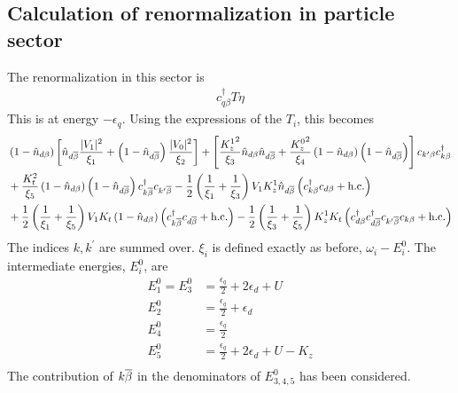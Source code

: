 \documentclass[12pt,twoside]{article}
\numberwithin{equation}{section}
\begin{document}
\subsection{Calculation of renormalization in particle sector}
The renormalization in this sector is
\begin{equation}\begin{aligned}
	c^\dagger_{q\beta} T \eta
\end{aligned}\end{equation}
This is at energy \(-\epsilon_q\).
Using the expressions of the \(T_i\), this becomes
\begin{equation}\begin{aligned}
	&\left(1 - \hat n_{d\beta}\right)\left[\hat n_{d\overline\beta}\frac{|V_1|^2}{\xi_1} + \left(1 - \hat n_{d\overline\beta}\right)\frac{|V_0|^2}{\xi_2}\right] + \left[\frac{{K_z^1}^2}{\xi_3}\hat n_{d\beta}\hat n_{d\overline\beta} + \frac{{K_z^0}^2}{\xi_4}\left(1 - \hat n_{d\beta}\right)\left(1 - \hat n_{d\overline\beta}\right)\right]c_{k^\prime\beta}c^\dagger_{k\beta} \\
	&+ \frac{K_t^2}{\xi_5}\left(1 - \hat n_{d\beta}\right)\left(1 - \hat n_{d\overline\beta}\right)c^\dagger_{k\overline\beta}c_{k^\prime\overline\beta} - \frac{1}{2}\left(\frac{1}{\xi_1} + \frac{1}{\xi_3} \right)V_1 K_z^1 \hat n_{d\overline\beta}\left(c^\dagger_{k\beta}c_{d\beta} + \text{h.c.}\right) \\
	&+ \frac{1}{2}\left(\frac{1}{\xi_1} + \frac{1}{\xi_5} \right)V_1 K_t \left(1 - \hat n_{d\beta}\right)\left(c^\dagger_{k\overline\beta}c_{d\overline\beta} + \text{h.c.}\right)- \frac{1}{2}\left(\frac{1}{\xi_3} + \frac{1}{\xi_5} \right)K_z^1 K_t \left(c^\dagger_{d\beta}c^\dagger_{d\overline\beta}c_{k^\prime\overline\beta}c_{k\beta} + \text{h.c.}\right)
\end{aligned}\end{equation}
The indices \(k,k^\prime\) are summed over.
\(\xi_i\) is defined exactly as before, \(\omega_i - E_i^0\).
\pb The intermediate energies, \(E_i^0\), are
\begin{equation}\begin{aligned}
	E^0_1 = E_3^0 &= \frac{\epsilon_q}{2} + 2\epsilon_d + U\\
	E^0_2 &= \frac{\epsilon_q}{2} + \epsilon_d \\
	E^0_4 &= \frac{\epsilon_q}{2}\\
	E_5^0 &= \frac{\epsilon_q}{2} + 2\epsilon_d + U - K_z\\
\end{aligned}\end{equation}
The contribution of \(k\overline\beta\) in the denominators of \(E^0_{3,4,5}\) has been considered.
\end{document}
